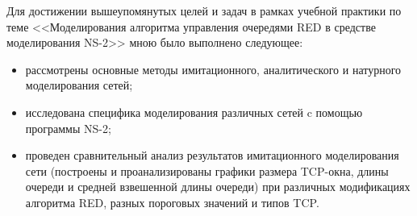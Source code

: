 Для достижении вышеупомянутых целей и задач в рамках учебной практики
по теме <<Моделирования алгоритма управления очередями RED в средстве
моделирования NS-2>> мною было выполнено следующее:
\begin{itemize}
\item рассмотрены основные методы имитационного, аналитического и
  натурного моделирования сетей;
\item исследована специфика моделирования различных сетей c помощью
  программы NS-2;
\item проведен сравнительный анализ результатов имитационного
  моделирования сети (построены и проанализированы графики размера
  TCP-окна, длины очереди и средней взвешенной длины очереди) при
  различных модификациях алгоритма RED, разных пороговых значений и
  типов TCP.
\end{itemize}
